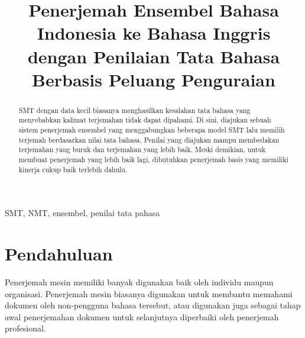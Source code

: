 \documentclass[conference]{IEEEtran}
\begin{document}
\title{Penerjemah Ensembel Bahasa Indonesia ke Bahasa Inggris dengan Penilaian Tata Bahasa Berbasis Peluang Penguraian\\
}

\author{
\and
{}
\and
{}
}

\maketitle

\begin{abstract}
SMT dengan data kecil biasanya menghasilkan kesalahan tata bahasa yang menyebabkan kalimat terjemahan tidak dapat dipahami. Di sini, diajukan sebuah sistem penerjemah ensembel yang menggabungkan beberapa model SMT lalu memilih terjemah berdasarkan nilai tata bahasa. Penilai yang diajukan mampu membedakan terjemahan yang buruk dan terjemahan yang lebih baik. Meski demikian, untuk membuat penerjemah yang lebih baik lagi, dibutuhkan penerjemah basis yang memiliki kinerja cukup baik terlebih dahulu.
\end{abstract}

\begin{IEEEkeywords}
SMT, NMT, ensembel, penilai tata pahasa
\end{IEEEkeywords}

\section{Pendahuluan}

Penerjemah mesin memiliki banyak digunakan baik oleh individu maupun organisasi. Penerjemah mesin biasanya digunakan untuk membantu memahami dokumen oleh non-pengguna bahasa tersebut, atau digunakan juga sebagai tahap awal penerjemahan dokumen untuk selanjutnya diperbaiki oleh penerjemah profesional.
\end{document}
